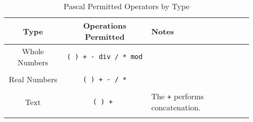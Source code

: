 \begin{table}[h]
  \centering
  \begin{tabular}{|c|c|l|}
    \hline
    \textbf{Type} & \textbf{Operations Permitted} & \textbf{Notes}\\
    \hline
    Whole Numbers     &   \texttt{( ) + - div / * mod} & \\
       & & \\
    Real Numbers   &   \texttt{( ) + - / *} &    \\
       & & \\
    Text           &   \texttt{( ) + }          & The \texttt{+} performs concatenation.\\
       & & \\
    \hline
  \end{tabular}
  \caption{Pascal Permitted Operators by Type}
  \label{tbl:program-creation-pas operators by type}
\end{table}

